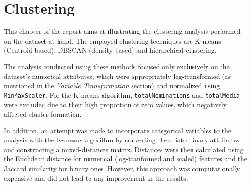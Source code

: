 \chapter{Clustering}
\label{ch:capitolo2}

This chapter of the report aims at illustrating the clustering analysis performed on the dataset at hand.
The employed clustering techniques are K-means (Centroid-based), DBSCAN (density-based) and hierarchical clustering.

The analysis conducted using these methods focused only exclusively on the dataset's numerical attributes, which were appropriately log-transformed (as mentioned in the \textit{Variable Transformation} section) and normalized using \texttt{MinMaxScaler}.  
For the K-means algorithm, \texttt{totalNominations} and \texttt{totalMedia} were excluded due to their high proportion of zero values, which negatively affected cluster formation.

In addition, an attempt was made to incorporate categorical variables to the analysis with the K-means algorithm by converting them into binary attributes and constructing a mixed-distances matrix. 
Distances were then calculated using the Euclidean distance for numerical (log-tranformed and scaled) features and the Jaccard similarity for binary ones. 
However, this approach was computationally expensive and did not lead to any improvement in the results.


